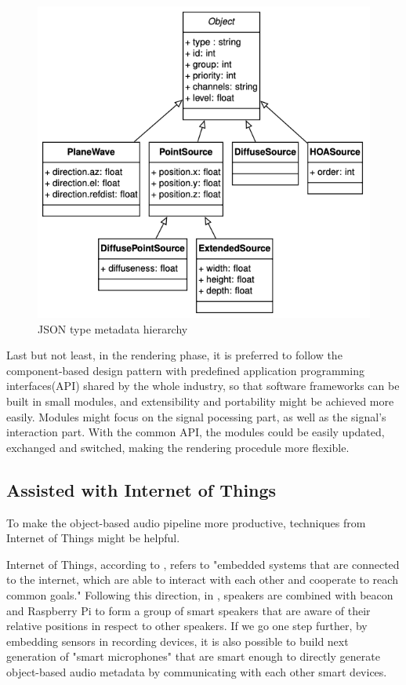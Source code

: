 \documentclass[jou]{apa6}
\begin{document}
\begin{figure}[h!]
    \includegraphics[width=\linewidth]{hierarchy.png}
    \caption{JSON type metadata hierarchy}
    \label{fig:Figure2}
\end{figure}

Last but not least, in the rendering phase, it is preferred to follow the component-based design pattern with predefined application programming interfaces(API) shared by the whole industry, so that software frameworks can be built in small modules, and extensibility and portability might be achieved more easily. Modules might focus on the signal pocessing part, as well as the signal's interaction part. With the common API, the modules could be easily updated, exchanged and switched, making the rendering procedule more flexible.

\subsection{Assisted with Internet of Things}

To make the object-based audio pipeline more productive, techniques from Internet of Things might be helpful. 

Internet of Things, according to \textcite{turchet2018internet}, refers to "embedded systems that are connected to the internet, which are able to interact with each other and cooperate to reach common goals." Following this direction, in \textcite{lee2017location}, speakers are combined with beacon and Raspberry Pi to form a group of smart speakers that are aware of their relative positions in respect to other speakers. If we go one step further, by embedding sensors in recording devices, it is also possible to build next generation of "smart microphones" that are smart enough to directly generate object-based audio metadata by communicating with each other smart devices.
\end{document}
